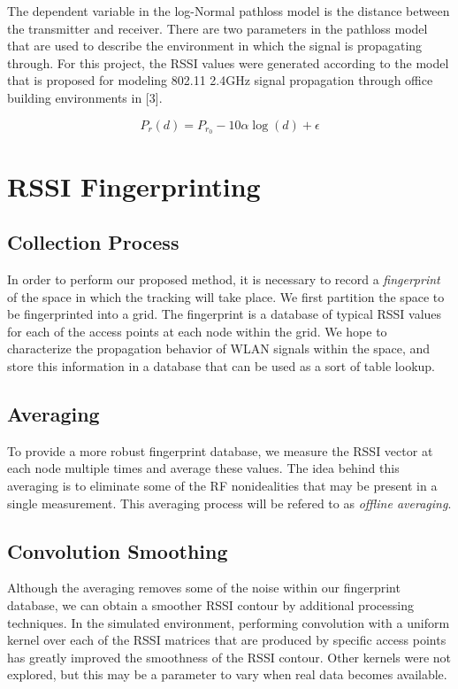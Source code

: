 \documentclass[12pt, a4paper]{article}
\begin{document}
			The dependent variable in the log-Normal pathloss model is the distance between the transmitter and receiver. There are two parameters in the pathloss model that are used to describe the environment in which the signal is propagating through. For this project, the RSSI values were generated according to the model that is proposed for modeling 802.11 2.4GHz signal propagation through office building environments in [3]. 

			\begin{equation}
				P_{r}(\mathit{d}) = P_{r_0} - 10\alpha \log(\mathit{d}) + \epsilon
			\end{equation}

	\section{RSSI Fingerprinting}
		\subsection{Collection Process}
			In order to perform our proposed method, it is necessary to record a \textit{fingerprint} of the space in which the tracking will take place. We first partition the space to be fingerprinted into a grid. The fingerprint is a database of typical RSSI values for each of the access points at each node within the grid. We hope to characterize the propagation behavior of WLAN signals within the space, and store this information in a database that can be used as a sort of table lookup. 
		\subsection{Averaging}
			To provide a more robust fingerprint database, we measure the RSSI vector at each node multiple times and average these values. The idea behind this averaging is to eliminate some of the RF nonidealities that may be present in a single measurement. This averaging process will be refered to as \textit{offline averaging}.
		\subsection{Convolution Smoothing}
			Although the averaging removes some of the noise within our fingerprint database, we can obtain a smoother RSSI contour by additional processing techniques. In the simulated environment, performing convolution with a uniform kernel over each of the RSSI matrices that are produced by specific access points has greatly improved the smoothness of the RSSI contour. Other kernels were not explored, but this may be a parameter to vary when real data becomes available.
\end{document}
